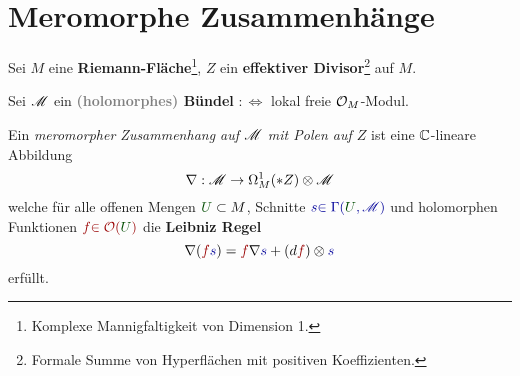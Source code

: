 \section{Meromorphe Zusammenhänge} %
Sei $M$ eine \textbf{Riemann-Fläche}\footnote{Komplexe Mannigfaltigkeit von
Dimension 1.}, $Z$ ein \textbf{effektiver Divisor}\footnote{Formale Summe von
Hyperflächen mit positiven Koeffizienten.} auf $M$.
\begin{comment}
  Über jedem Punkt von $M\backslash Z$ hat man einen endlichen Vektorraum von
  `initial data' und erhalte ein holomorphes Bündel $\sM$ auf $M$
  \textcolor{gray}{(durch fortsetzen)}.
  \\Weiter gibt es zu jedem $x\in X$ und jedem Keim $u\in\sM_x$ in der Faser
  bei $x$ gibt es einen eindeutig bestimmten Schnitt in der Umgebung von $x$.
\end{comment}
Sei $\mathscr{M}$ ein \textbf{\textcolor{gray}{(holomorphes)} Bündel}
$:\Leftrightarrow{}$ lokal freie $\mathcal{O}_M$-Modul.
\begin{defn}
  \def\myU{\textcolor{green!30!black}{U}}
  \def\mys{\textcolor{blue!60!black}{s}}
  \def\myf{\textcolor{red!60!black}{f}}
  Ein \emph{meromorpher Zusammenhang auf $\mathscr{M}$ mit Polen auf $Z$}
  ist eine $\mathbb{C}$-lineare Abbildung
  \[
    \nabla:\mathscr{M}\to\Omega_M^1(*Z)\otimes\mathscr{M}
  \]
  welche für alle offenen Mengen $\myU\subset M$, Schnitte
  $\mys\textcolor{blue!60!black}{\in\Gamma(\myU,\sM)}$ und holomorphen
  Funktionen $\myf\textcolor{red!60!black}{\in\cO(\myU)}$ die \textbf{Leibniz
  Regel}
  \[
    \nabla(\myf\mys)=\myf\nabla\mys+(d\myf)\otimes\mys
  \]
  erfüllt.

  \begin{comment}
    \begin{defn}
      Ein Zusammenhang heißt \emph{flach} oder \emph{integrabel} falls
          seine Krümmung
      $R_\nabla:=\nabla\circ\nabla:\sM\to\Omega_M^2(*Z)\otimes_{\cO_M}\sM$
      identisch verschwindet.\marginnote{\textcolor{gray}{$R_\nabla\equiv0$}}
      \begin{rem}
        \marginnote{\tiny \cite{sabbah2007isomonodromic} Rem 0.12.5}
        Für $\dim(M)=1$ ist jeder Zusammenhang flach.
        \textcolor{gray}{Also hier nicht von Bedeutung.}
      \end{rem}
    \end{defn}
  \end{comment}
\end{defn}
